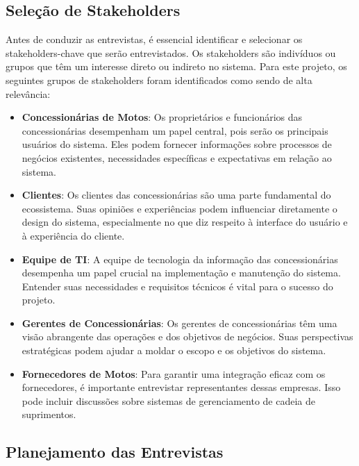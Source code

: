 \subsection{Seleção de Stakeholders}

Antes de conduzir as entrevistas, é essencial identificar e selecionar os stakeholders-chave que serão entrevistados. Os stakeholders são indivíduos ou grupos que têm um interesse direto ou indireto no sistema. Para este projeto, os seguintes grupos de stakeholders foram identificados como sendo de alta relevância:

\begin{itemize}
	\item \textbf{Concessionárias de Motos}: Os proprietários e funcionários das concessionárias desempenham um papel central, pois serão os principais usuários do sistema. Eles podem fornecer informações sobre processos de negócios existentes, necessidades específicas e expectativas em relação ao sistema.
	
	\item \textbf{Clientes}: Os clientes das concessionárias são uma parte fundamental do ecossistema. Suas opiniões e experiências podem influenciar diretamente o design do sistema, especialmente no que diz respeito à interface do usuário e à experiência do cliente.
	
	\item \textbf{Equipe de TI}: A equipe de tecnologia da informação das concessionárias desempenha um papel crucial na implementação e manutenção do sistema. Entender suas necessidades e requisitos técnicos é vital para o sucesso do projeto.
	
	\item \textbf{Gerentes de Concessionárias}: Os gerentes de concessionárias têm uma visão abrangente das operações e dos objetivos de negócios. Suas perspectivas estratégicas podem ajudar a moldar o escopo e os objetivos do sistema.
	
	\item \textbf{Fornecedores de Motos}: Para garantir uma integração eficaz com os fornecedores, é importante entrevistar representantes dessas empresas. Isso pode incluir discussões sobre sistemas de gerenciamento de cadeia de suprimentos.
\end{itemize}

\subsection{Planejamento das Entrevistas}

